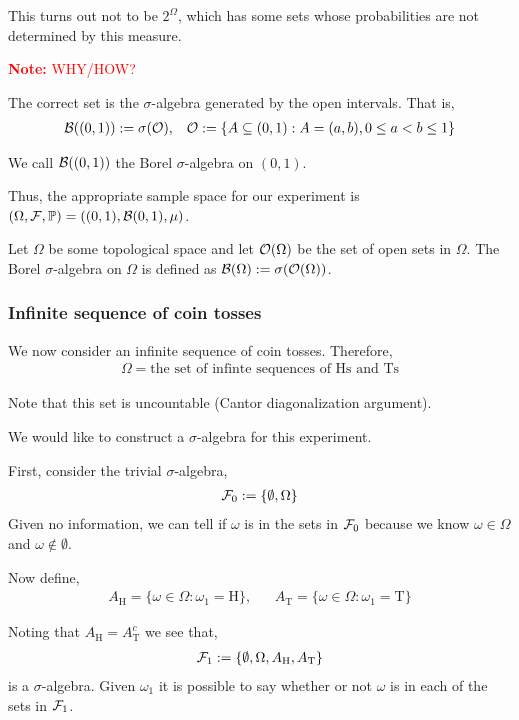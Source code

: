 \documentclass[12pt]{article}
\newcommand{\note}[1]{\textcolor{red}{\textbf{Note:} #1}}
\begin{document}
This turns out not to be \( 2^\Omega \), which has some sets whose probabilities are not determined by this measure.

\note{WHY/HOW?}

The correct set is the \( \sigma \)-algebra generated by the open intervals. That is,
\begin{align*}
    \mathcal{B}((0,1)):= \sigma(\mathcal{O}), && \mathcal{O}:=\{A\subseteq (0,1) : A = (a,b), 0\leq a<b\leq 1 \}
\end{align*}

We call \( \mathcal{B}((0,1)) \) the Borel \( \sigma \)-algebra on \( (0,1) \).

Thus, the appropriate sample space for our experiment is \( (\Omega,\mathcal{F},\mathbb{P}) = ((0,1),\mathcal{B}(0,1),\mu) \).

\begin{definition}
Let \( \Omega \) be some topological space and let \( \mathcal{O}(\Omega) \) be the set of open sets in \( \Omega \). The Borel \( \sigma \)-algebra on \( \Omega \) is defined as \( \mathcal{B}(\Omega) := \sigma(\mathcal{O}(\Omega)) \).
\end{definition}

\subsubsection{Infinite sequence of coin tosses}
We now consider an infinite sequence of coin tosses. Therefore,
\begin{align*}
    \Omega = \text{the set of infinte sequences of Hs and Ts}
\end{align*}

Note that this set is uncountable (Cantor diagonalization argument).

We would like to construct a \( \sigma \)-algebra for this experiment.

First, consider the trivial \( \sigma \)-algebra,
\begin{align*}
    \mathcal{F}_0 := \{\emptyset,\Omega\}
\end{align*}
Given no information, we can tell if \( \omega \) is in the sets in \( \mathcal{F}_0 \) because we know \( \omega \in \Omega \) and \( \omega\notin \emptyset \).

Now define,
\begin{align*}
    A_{\text{H}} = \{\omega \in \Omega : \omega_1 = \text{H}\}, &&
    A_{\text{T}} = \{\omega \in \Omega : \omega_1 = \text{T}\}
\end{align*}

Noting that \( A_{\text{H}} = A_{\text{T}}^c \) we see that,
\begin{align*}
    \mathcal{F}_1 := \{ \emptyset, \Omega, A_{\text{H}}, A_{\text{T}} \}
\end{align*}
is a \( \sigma \)-algebra. Given \( \omega_1 \) it is possible to say whether or not \( \omega \) is in each of the sets in \( \mathcal{F}_1 \).
\end{document}
